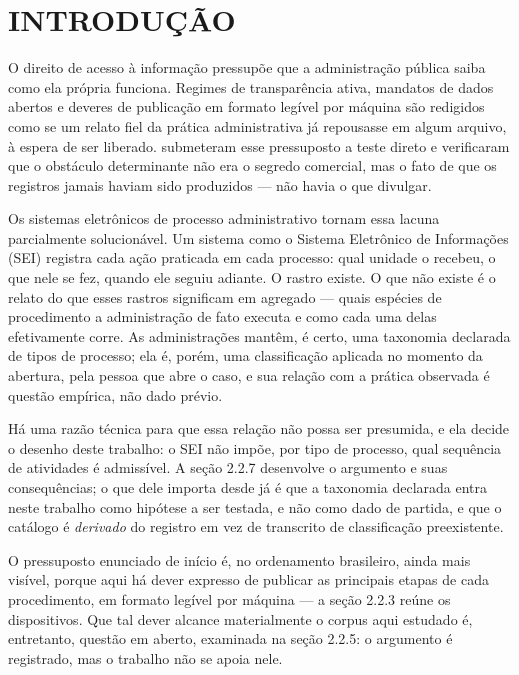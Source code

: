 \section{INTRODUÇÃO}

O direito de acesso à informação pressupõe que a administração pública saiba como ela própria
funciona. Regimes de transparência ativa, mandatos de dados abertos e deveres de publicação em
formato legível por máquina são redigidos como se um relato fiel da prática administrativa já
repousasse em algum arquivo, à espera de ser liberado. 
submeteram esse pressuposto a teste direto e verificaram que o obstáculo determinante não era o
segredo comercial, mas o fato de que os registros jamais haviam sido produzidos --- não havia o
que divulgar.

Os sistemas eletrônicos de processo administrativo tornam essa lacuna parcialmente solucionável. Um
sistema como o Sistema Eletrônico de Informações (SEI) registra cada ação praticada em cada
processo: qual unidade o recebeu, o que nele se fez, quando ele seguiu adiante. O rastro existe.
O que não existe é o relato do que esses rastros significam em agregado --- quais espécies de
procedimento a administração de fato executa e como cada uma delas efetivamente corre. As
administrações mantêm, é certo, uma taxonomia declarada de tipos de processo; ela é, porém, uma
classificação aplicada no momento da abertura, pela pessoa que abre o caso, e sua relação com a
prática observada é questão empírica, não dado prévio.

Há uma razão técnica para que essa relação não possa ser presumida, e ela decide o desenho deste
trabalho: o SEI não impõe, por tipo de processo, qual sequência de atividades é admissível. A
seção 2.2.7 desenvolve o argumento e suas consequências; o que dele importa desde já é que a
taxonomia declarada entra neste trabalho como hipótese a ser testada, e não como dado de partida,
e que o catálogo é \emph{derivado} do registro em vez de transcrito de classificação
preexistente.

O pressuposto enunciado de início é, no ordenamento brasileiro, ainda mais visível, porque aqui
há dever expresso de publicar as principais etapas de cada procedimento, em formato legível por
máquina --- a seção 2.2.3 reúne os dispositivos. Que tal dever alcance materialmente o corpus aqui estudado é,
entretanto, questão em aberto, examinada na seção 2.2.5: o argumento é registrado, mas o trabalho
não se apoia nele.

